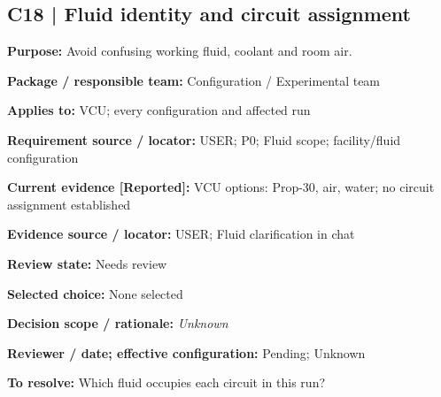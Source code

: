 \documentclass[11pt]{article}
\begin{document}
\par\noindent\begin{minipage}{\textwidth}\small\setlength{\parskip}{2pt}
\subsection*{C18 | Fluid identity and circuit assignment}
\textbf{Purpose:} Avoid confusing working fluid, coolant and room air.\par
\textbf{Package / responsible team:} Configuration / Experimental team\par
\textbf{Applies to:} VCU; every configuration and affected run\par
\textbf{Requirement source / locator:} USER; P0; Fluid scope; facility/fluid configuration\par
\textbf{Current evidence [Reported]:} VCU options: Prop-30, air, water; no circuit assignment established\par
\textbf{Evidence source / locator:} USER; Fluid clarification in chat\par
\textbf{Review state:} Needs review\par
\textbf{Selected choice:} None selected\par
\textbf{Decision scope / rationale:} \textit{Unknown}\par
\textbf{Reviewer / date; effective configuration:} Pending; Unknown\par
\textbf{To resolve:} Which fluid occupies each circuit in this run?\par
\end{minipage}\par\vspace{5pt}
\end{document}
